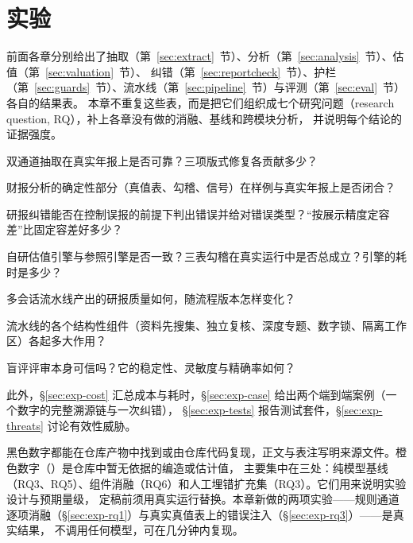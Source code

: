 \section{实验}
\label{sec:exp}

前面各章分别给出了抽取（第~\ref{sec:extract}~节）、分析（第~\ref{sec:analysis}~节）、估值（第~\ref{sec:valuation}~节）、
纠错（第~\ref{sec:reportcheck}~节）、护栏（第~\ref{sec:guards}~节）、流水线（第~\ref{sec:pipeline}~节）与评测（第~\ref{sec:eval}~节）各自的结果表。
本章不重复这些表，而是把它们组织成七个研究问题（research question, RQ），补上各章没有做的消融、基线和跨模块分析，
并说明每个结论的证据强度。

\begin{description}[leftmargin=2.6em,labelwidth=2.2em]
  \item[RQ1] 双通道抽取在真实年报上是否可靠？三项版式修复各贡献多少？
  \item[RQ2] 财报分析的确定性部分（真值表、勾稽、信号）在样例与真实年报上是否闭合？
  \item[RQ3] 研报纠错能否在控制误报的前提下判出错误并给对错误类型？“按展示精度定容差”比固定容差好多少？
  \item[RQ4] 自研估值引擎与参照引擎是否一致？三表勾稽在真实运行中是否总成立？引擎的耗时是多少？
  \item[RQ5] 多会话流水线产出的研报质量如何，随流程版本怎样变化？
  \item[RQ6] 流水线的各个结构性组件（资料先搜集、独立复核、深度专题、数字锁、隔离工作区）各起多大作用？
  \item[RQ7] 盲评评审本身可信吗？它的稳定性、灵敏度与精确率如何？
\end{description}

此外，\S\ref{sec:exp-cost} 汇总成本与耗时，\S\ref{sec:exp-case} 给出两个端到端案例（一个数字的完整溯源链与一次纠错），
\S\ref{sec:exp-tests} 报告测试套件，\S\ref{sec:exp-threats} 讨论有效性威胁。

\begin{insight}[：如何读本章的数字]
黑色数字都能在仓库产物中找到或由仓库代码复现，正文与表注写明来源文件。橙色数字（）是仓库中暂无依据的编造或估计值，
主要集中在三处：纯模型基线（RQ3、RQ5）、组件消融（RQ6）和人工埋错扩充集（RQ3）。它们用来说明实验设计与预期量级，
定稿前须用真实运行替换。本章新做的两项实验——规则通道逐项消融（\S\ref{sec:exp-rq1}）与真实真值表上的错误注入（\S\ref{sec:exp-rq3}）——是真实结果，
不调用任何模型，可在几分钟内复现。
\end{insight}

